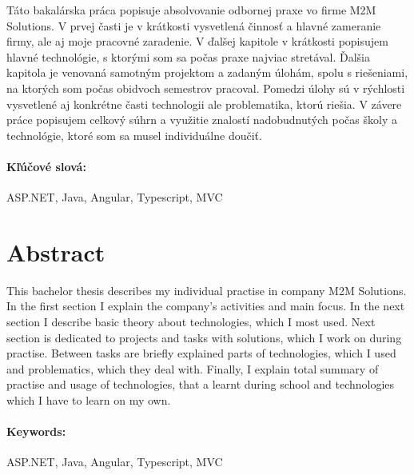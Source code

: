 \documentclass[11pt, oneside]{report}
\begin{document}
Táto bakalárska práca popisuje absolvovanie odbornej praxe vo firme M2M Solutions. V prvej časti je v krátkosti   vysvetlená činnosť a hlavné zameranie firmy, ale aj moje pracovné zaradenie. V ďalšej kapitole  v krátkosti popisujem  hlavné technológie, s ktorými som sa počas praxe najviac stretával. Ďalšia  kapitola je venovaná samotným projektom a zadaným úlohám,  spolu s riešeniami, na ktorých som  počas obidvoch semestrov pracoval. Pomedzi úlohy  sú v rýchlosti vysvetlené aj konkrétne  časti technologii ale  problematika, ktorú riešia. V závere práce popisujem  celkový súhrn  a využitie  znalostí  nadobudnutých počas školy a technológie, ktoré  som sa musel individuálne doučiť.



\paragraph*{Kľúčové slová:} ASP.NET, Java, Angular, Typescript, MVC

\paragraph*{}

\section*{Abstract}
This bachelor thesis describes my individual practise in company M2M Solutions. In the first section I explain the company's  activities and main focus. In the next section I describe basic theory about technologies, which I most used. Next section is dedicated to projects and tasks with solutions, which I work on during practise. Between tasks are briefly explained  parts of technologies, which  I used and problematics, which they deal with. Finally, I explain total summary of practise and usage of technologies, that a learnt during school and technologies which I have to learn on my own.


\paragraph*{Keywords:}  ASP.NET, Java, Angular, Typescript, MVC




\newpage 
\tableofcontents
\end{document}

